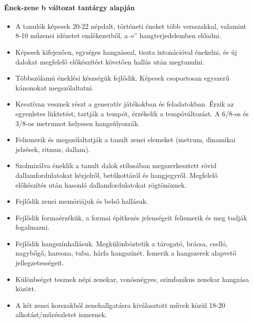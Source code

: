 \paragraph{Ének-zene
  b változat tantárgy alapján}
\begin{itemize}
\item A tanulók képesek 20-22 népdalt, történeti éneket több versszakkal, valamint 8-10 műzenei idézetet emlékezetből, a–e” hangterjedelemben előadni.
\item Képesek kifejezően, egységes hangzással, tiszta intonációval énekelni, és új dalokat megfelelő előkészítést követően hallás után megtanulni.
\item Többszólamú éneklési készségük fejlődik. Képesek csoportosan egyszerű kánonokat megszólaltatni.
\item Kreatívan vesznek részt a generatív játékokban és feladatokban. Érzik az egyenletes lüktetést, tartják a tempót, érzékelik a tempóváltozást. A 6/8-os és 3/8-os metrumot helyesen hangsúlyozzák.
\item Felismerik és megszólaltatják a tanult zenei elemeket (metrum, dinamikai jelzések, ritmus, dallam).
\item Szolmizálva éneklik a tanult dalok stílusában megszerkesztett rövid dallamfordulatokat kézjelről, betűkottáról és hangjegyről. Megfelelő előkészítés után hasonló dallamfordulatokat rögtönöznek.
\item Fejlődik zenei memóriájuk és belső hallásuk.
\item Fejlődik formaérzékük, a formai építkezés jelenségeit felismerik és meg tudják fogalmazni.
\item Fejlődik hangszínhallásuk. Megkülönböztetik a tárogató, brácsa, cselló, nagybőgő, harsona, tuba, hárfa hangszínét. Ismerik a hangszerek alapvető jellegzetességeit.
\item Különbséget tesznek népi zenekar, vonósnégyes, szimfonikus zenekar hangzása között.
\item A két zenei korszakból zenehallgatásra kiválasztott művek közül 18-20 alkotást/műrészletet ismernek.
\end{itemize}

